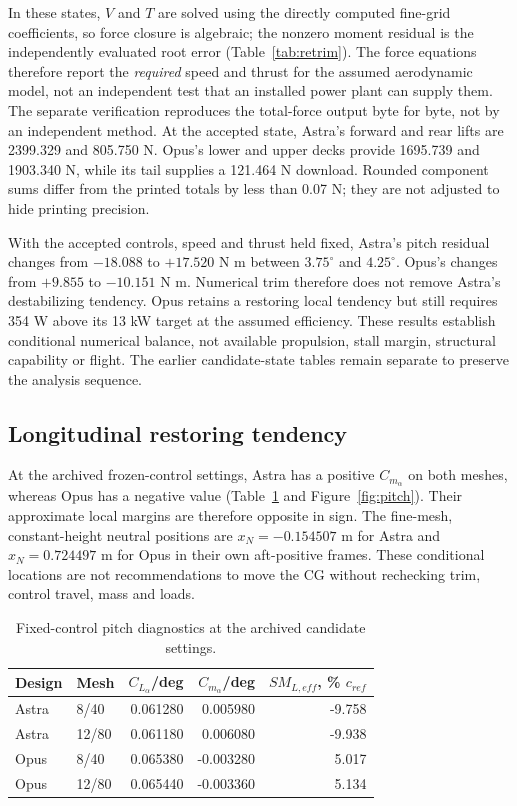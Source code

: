 \documentclass[10pt,letterpaper]{article}
\begin{document}
In these states, $V$ and $T$ are solved using the directly computed fine-grid coefficients, so force closure is algebraic; the nonzero moment residual is the independently evaluated root error (Table~\ref{tab:retrim}). The force equations therefore report the \emph{required} speed and thrust for the assumed aerodynamic model, not an independent test that an installed power plant can supply them. The separate verification reproduces the total-force output byte for byte, not by an independent method. At the accepted state, Astra's forward and rear lifts are 2399.329 and 805.750 N. Opus's lower and upper decks provide 1695.739 and 1903.340 N, while its tail supplies a 121.464 N download. Rounded component sums differ from the printed totals by less than 0.07 N; they are not adjusted to hide printing precision.

With the accepted controls, speed and thrust held fixed, Astra's pitch residual changes from $-18.088$ to $+17.520$ N m between $3.75^\circ$ and $4.25^\circ$. Opus's changes from $+9.855$ to $-10.151$ N m. Numerical trim therefore does not remove Astra's destabilizing tendency. Opus retains a restoring local tendency but still requires 354 W above its 13 kW target at the assumed efficiency. These results establish conditional numerical balance, not available propulsion, stall margin, structural capability or flight. The earlier candidate-state tables remain separate to preserve the analysis sequence.

\subsection{Longitudinal restoring tendency}
At the archived frozen-control settings, Astra has a positive $C_{m_\alpha}$ on both meshes, whereas Opus has a negative value (Table~\ref{tab:stability} and Figure~\ref{fig:pitch}). Their approximate local margins are therefore opposite in sign. The fine-mesh, constant-height neutral positions are $x_N=-0.154507$ m for Astra and $x_N=0.724497$ m for Opus in their own aft-positive frames. These conditional locations are not recommendations to move the CG without rechecking trim, control travel, mass and loads.

\begin{table}[H]\centering\small
\caption{Fixed-control pitch diagnostics at the archived candidate settings.}\label{tab:stability}
\begin{tabular}{llrrr}\toprule
Design & Mesh & $C_{L_\alpha}$/deg & $C_{m_\alpha}$/deg & $SM_{L,eff}$, \% $c_{ref}$\\\midrule
Astra &8/40&0.061280&0.005980&-9.758\\
Astra &12/80&0.061180&0.006080&-9.938\\
Opus &8/40&0.065380&-0.003280&5.017\\
Opus &12/80&0.065440&-0.003360&5.134\\\bottomrule
\end{tabular}
\end{table}
\end{document}
